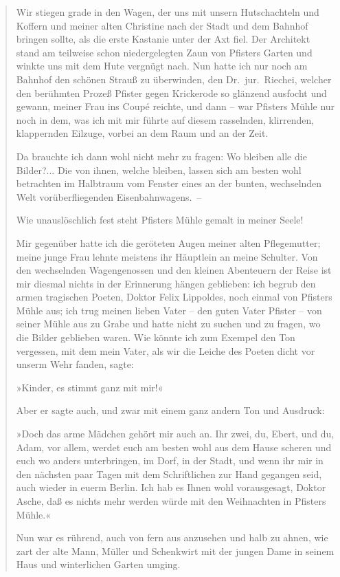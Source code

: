 \begin{verse}
Wir stiegen grade in den Wagen, der uns mit unsern Hutschachteln
und Koffern und meiner alten Christine nach der Stadt und dem
Bahnhof bringen sollte, als die erste Kastanie unter der Axt fiel.
Der Architekt stand am teilweise schon niedergelegten Zaun von
Pfisters Garten und winkte uns mit dem Hute vergnügt nach. Nun
hatte ich nur noch am Bahnhof den schönen Strauß zu überwinden, den
Dr.~jur.~Riechei, welcher den berühmten Prozeß Pfister gegen
Krickerode so glänzend ausfocht und gewann, meiner Frau ins Coupé
reichte, und dann – war Pfisters Mühle nur noch in dem, was ich mit
mir führte auf diesem rasselnden, klirrenden, klappernden Eilzuge,
vorbei an dem Raum und an der Zeit.

Da brauchte ich dann wohl nicht mehr zu fragen: Wo bleiben alle die
Bilder?... Die von ihnen, welche bleiben, lassen sich am besten
wohl betrachten im Halbtraum vom Fenster eines an der bunten,
wechselnden Welt vorüberfliegenden Eisenbahnwagens.~–

Wie unauslöschlich fest steht Pfisters Mühle gemalt in meiner
Seele!

Mir gegenüber hatte ich die geröteten Augen meiner alten
Pflegemutter; meine junge Frau lehnte meistens ihr Häuptlein an
meine Schulter. Von den wechselnden Wagengenossen und den kleinen
Abenteuern der Reise ist mir diesmal nichts in der Erinnerung
hängen geblieben: ich begrub den armen tragischen Poeten, Doktor
Felix Lippoldes, noch einmal von Pfisters Mühle aus; ich trug
meinen lieben Vater – den guten Vater Pfister – von seiner Mühle
aus zu Grabe und hatte nicht zu suchen und zu fragen, wo die Bilder
geblieben waren. Wie könnte ich zum Exempel den Ton vergessen, mit
dem mein Vater, als wir die Leiche des Poeten dicht vor unserm Wehr
fanden, sagte:

»Kinder, es stimmt ganz mit mir!«

Aber er sagte auch, und zwar mit einem ganz andern Ton und
Ausdruck:

»Doch das arme Mädchen gehört mir auch an. Ihr zwei, du, Ebert, und
du, Adam, vor allem, werdet euch am besten wohl aus dem Hause
scheren und euch wo anders unterbringen, im Dorf, in der Stadt, und
wenn ihr mir in den nächsten paar Tagen mit dem Schriftlichen zur
Hand gegangen seid, auch wieder in euerm Berlin. Ich hab es Ihnen
wohl vorausgesagt, Doktor Asche, daß es nichts mehr werden würde
mit den Weihnachten in Pfisters Mühle.«

Nun war es rührend, auch von fern aus anzusehen und halb zu ahnen,
wie zart der alte Mann, Müller und Schenkwirt mit der jungen Dame
in seinem Haus und winterlichen Garten umging.


\end{verse}
